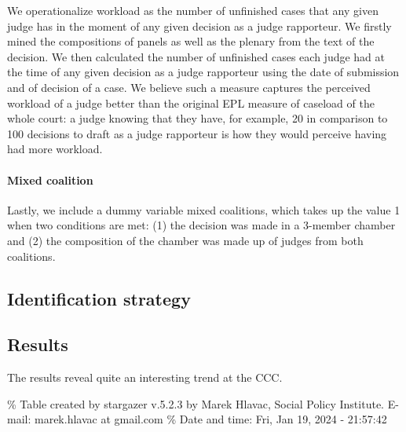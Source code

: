 \documentclass[
  11pt,
]{article}
\begin{document}
We operationalize workload as the number of unfinished cases that any
given judge has in the moment of any given decision as a judge
rapporteur. We firstly mined the compositions of panels as well as the
plenary from the text of the decision. We then calculated the number of
unfinished cases each judge had at the time of any given decision as a
judge rapporteur using the date of submission and of decision of a case.
We believe such a measure captures the perceived workload of a judge
better than the original EPL measure of caseload of the whole court: a
judge knowing that they have, for example, 20 in comparison to 100
decisions to draft as a judge rapporteur is how they would perceive
having had more workload.

\hypertarget{mixed-coalition}{%
\paragraph{Mixed coalition}\label{mixed-coalition}}

Lastly, we include a dummy variable mixed coalitions, which takes up the
value 1 when two conditions are met: (1) the decision was made in a
3-member chamber and (2) the composition of the chamber was made up of
judges from both coalitions.

\hypertarget{identification-strategy}{%
\subsection{Identification strategy}\label{identification-strategy}}

\hypertarget{results}{%
\subsection{Results}\label{results}}

The results reveal quite an interesting trend at the CCC.

\% Table created by stargazer v.5.2.3 by Marek Hlavac, Social Policy
Institute. E-mail: marek.hlavac at gmail.com \% Date and time: Fri, Jan
19, 2024 - 21:57:42
\end{document}
